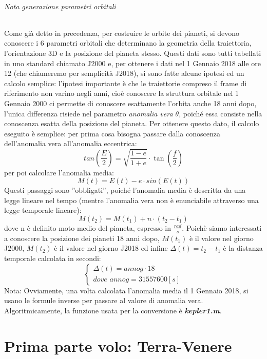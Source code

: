 \documentclass[a4paper]{article}
\begin{document}
\paragraph{Nota generazione parametri orbitali\newline}
Come già detto in precedenza, per costruire le orbite dei pianeti, si devono conoscere i 6 parametri orbitali che determinano la geometria della traiettoria, l'orientazione 3D e la posizione del pianeta stesso. Questi dati sono tutti tabellati in uno standard chiamato J2000 e, per ottenere i dati nel 1 Gennaio 2018 alle ore 12 (che chiameremo per semplicità J2018), si sono fatte alcune ipotesi ed un calcolo semplice: l'ipotesi importante è che le traiettorie compreso il frame di riferimento non varino negli anni, cioè conoscere la struttura orbitale nel 1 Gennaio 2000 ci permette di conoscere esattamente l'orbita anche 18 anni dopo, l'unica differenza risiede nel parametro \textit{anomalia vera $\theta$}, poiché essa consiste nella conoscenza esatta della posizione del pianeta.\newline
Per ottenere questo dato, il calcolo eseguito è semplice:\newline
per prima cosa bisogna passare dalla conoscenza dell'anomalia vera all'anomalia eccentrica:\newline
\[
tan(\frac{E}{2}) = \sqrt{\frac{1-e}{1+e}} \cdot \tan(\frac{f}{2})
\]
per poi calcolare l'anomalia media:
\[
M(t) = E(t) - \textit{e}\cdot sin(E(t))
\]
Questi passaggi sono ''obbligati'', poiché l'anomalia media è descritta da una legge lineare nel tempo (mentre l'anomalia vera non è enunciabile attraverso una legge temporale lineare):
\[
M(t_{2}) = M(t_{1})+n\cdot(t_{2}-t_{1})
\]
dove n è definito moto medio del pianeta, espresso in $\frac{rad}{s}$. \newline Poichè siamo interessati a conoscere la posizione dei pianeti 18 anni dopo, $M(t_{1})$ è il valore nel giorno J2000, $M(t_{2})$ è il valore nel giorno J2018 ed infine $\Delta(t) = t_{2}-t_{1}$ è la distanza temporale calcolata in secondi:
\[
\begin{cases}
\Delta(t) = \textit{annog} \cdot 18 \\
dove \textit{  annog} = 31557600 [s]
\end{cases}
\]
Nota: Ovviamente, una volta calcolata l'anomalia media il 1 Gennaio 2018, si usano le formule inverse per passare al valore di anomalia vera. Algoritmicamente, la funzione usata per la conversione è \textit{\textbf{kepler1.m}}.

\newpage
\part{Prima parte volo: Terra-Venere}
\end{document}
